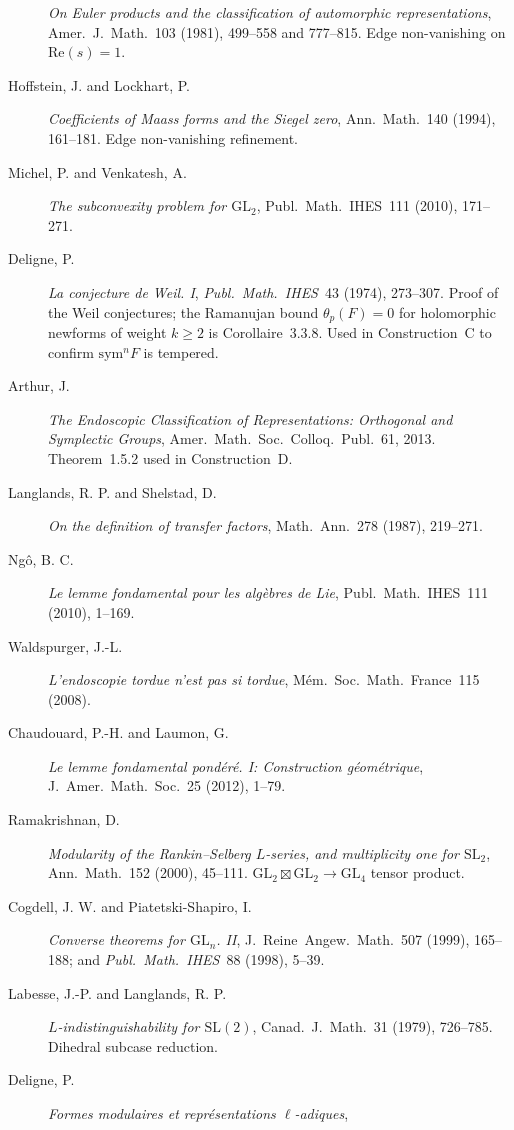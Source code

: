 \begin{description}
\emph{On Euler products and the classification of automorphic
representations}, Amer.~J.~Math.~103 (1981), 499--558 and 777--815.
Edge non-vanishing on \(\mathrm{Re}(s)=1\).
\item[Hoffstein, J. and Lockhart, P.]
\emph{Coefficients of Maass forms and the Siegel zero}, Ann.~Math.~140
(1994), 161--181. Edge non-vanishing refinement.
\item[Michel, P. and Venkatesh, A.]
\emph{The subconvexity problem for \(\mathrm{GL}_{2}\)},
Publ.~Math.~IHES~111 (2010), 171--271.
\item[Deligne, P.]
\emph{La conjecture de Weil. I}, \emph{Publ.~Math.~IHES}~43 (1974),
273--307. Proof of the Weil conjectures; the Ramanujan bound
\(\theta_{p}(F)=0\) for holomorphic newforms of weight \(k\geq 2\)
is Corollaire~3.3.8. Used in Construction~C to confirm \(\mathrm{sym}^{n}F\)
is tempered.
\item[Arthur, J.]
\emph{The Endoscopic Classification of Representations: Orthogonal and
Symplectic Groups}, Amer.~Math.~Soc.~Colloq.~Publ.~61, 2013.
Theorem~1.5.2 used in Construction~D.
\item[Langlands, R. P. and Shelstad, D.]
\emph{On the definition of transfer factors}, Math.~Ann.~278 (1987),
219--271.
\item[Ng\^o, B. C.]
\emph{Le lemme fondamental pour les alg\`ebres de Lie},
Publ.~Math.~IHES~111 (2010), 1--169.
\item[Waldspurger, J.-L.]
\emph{L'endoscopie tordue n'est pas si tordue},
M\'em.~Soc.~Math.~France~115 (2008).
\item[Chaudouard, P.-H. and Laumon, G.]
\emph{Le lemme fondamental pond\'er\'e. I: Construction
g\'eom\'etrique},
J.~Amer.~Math.~Soc.~25 (2012), 1--79.
\item[Ramakrishnan, D.]
\emph{Modularity of the Rankin--Selberg \(L\)-series, and multiplicity
one for \(\mathrm{SL}_{2}\)}, Ann.~Math.~152 (2000), 45--111.
\(\mathrm{GL}_{2}\boxtimes\mathrm{GL}_{2}\to\mathrm{GL}_{4}\) tensor
product.
\item[Cogdell, J. W. and Piatetski-Shapiro, I.]
\emph{Converse theorems for \(\mathrm{GL}_{n}\). II},
J.~Reine~Angew.~Math.~507 (1999), 165--188; and
\emph{Publ.~Math.~IHES}~88 (1998), 5--39.
\item[Labesse, J.-P. and Langlands, R. P.]
\emph{\(L\)-indistinguishability for \(\mathrm{SL}(2)\)},
Canad.~J.~Math.~31 (1979), 726--785. Dihedral subcase reduction.
\item[Deligne, P.]
\emph{Formes modulaires et repr\'esentations \(\ell\)-adiques},

\end{description}
